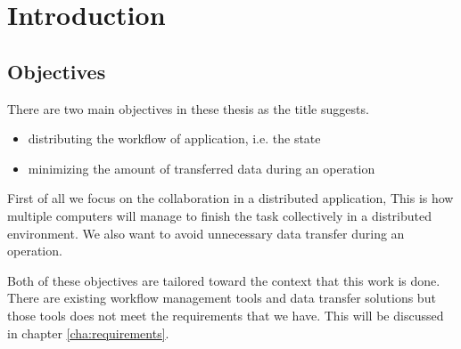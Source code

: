 \chapter{Introduction}
\label{cha:introduction}

\section{Objectives}
There are two main objectives in these thesis as the title suggests.
\begin{itemize}
\item distributing the workflow of application, i.e. the state
\item minimizing the amount of transferred data during an operation
\end{itemize}

First of all we focus on the collaboration in a distributed application, 
This is how multiple computers will manage to finish the task collectively in a distributed environment.
We also want to avoid unnecessary data transfer during an operation.

Both of these objectives are tailored toward the context that this work is done. There are existing workflow management tools
and data transfer solutions but those tools does not meet the requirements that we have. This will be discussed in chapter \ref{cha:requirements}.




